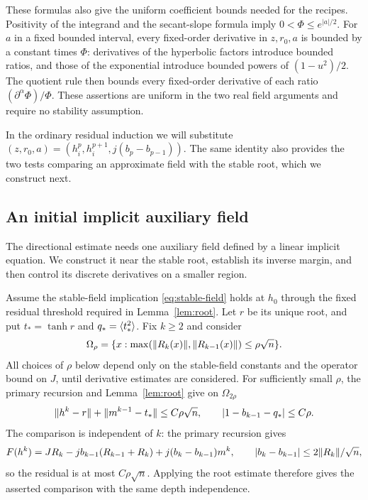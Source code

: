 These formulas also give the uniform coefficient bounds needed for the
recipes. Positivity of the integrand and the secant-slope formula imply
$0<\Phi\le e^{|a|/2}$. For $a$ in a fixed bounded interval, every
fixed-order derivative in $z,r_0,a$ is bounded by a constant times $\Phi$:
derivatives of the hyperbolic factors introduce bounded ratios, and those
of the exponential introduce bounded powers of $(1-u^2)/2$.
The quotient rule then bounds every fixed-order derivative of each ratio
$(\partial^\alpha\Phi)/\Phi$. These assertions are uniform in the two
real field arguments and require no stability assumption.

In the ordinary residual induction we will substitute
$(z,r_0,a)=(h_i^p,h_i^{p+1},j(b_p-b_{p-1}))$. The same identity also
provides the two tests comparing an approximate field with the stable
root, which we construct next.

\subsection{An initial implicit auxiliary field}

The directional estimate needs one auxiliary field defined by a linear
implicit equation. We construct it near the stable root, establish its
inverse margin, and then control its discrete derivatives on a smaller
region.

Assume the stable-field implication \eqref{eq:stable-field} holds at $h_0$
through the fixed residual threshold required in Lemma~\ref{lem:root}.
Let $r$ be its unique root, and put
$t_*=\tanh r$ and $q_*=\langle t_*^2\rangle$.  Fix $k\geq2$ and consider
\begin{equation}
 \Omega_\rho=
 \{x:\max(\lVert R_k(x)\rVert,\lVert R_{k-1}(x)\rVert)\leq\rho\sqrt n\}.
 \label{eq:small-region}
\end{equation}
All choices of $\rho$ below depend only on the stable-field constants and
the operator bound on $J$, until derivative estimates are considered.
For sufficiently small $\rho$, the primary recursion and
Lemma~\ref{lem:root} give on $\Omega_{2\rho}$
\begin{equation}
 \lVert h^k-r\rVert+\lVert m^{k-1}-t_*\rVert\leq C\rho\sqrt n,
 \qquad |1-b_{k-1}-q_*|\leq C\rho.
 \label{eq:implicit-near-root}
\end{equation}
The comparison is independent of $k$: the primary recursion gives
\[
 F(h^k)=JR_k-jb_{k-1}(R_{k-1}+R_k)
                     +j(b_k-b_{k-1})m^k,
 \qquad
 |b_k-b_{k-1}|\leq2\lVert R_k\rVert/\sqrt n,
\]
so the residual is at most $C\rho\sqrt n$. Applying the root estimate
therefore gives the asserted comparison with the same depth independence.


